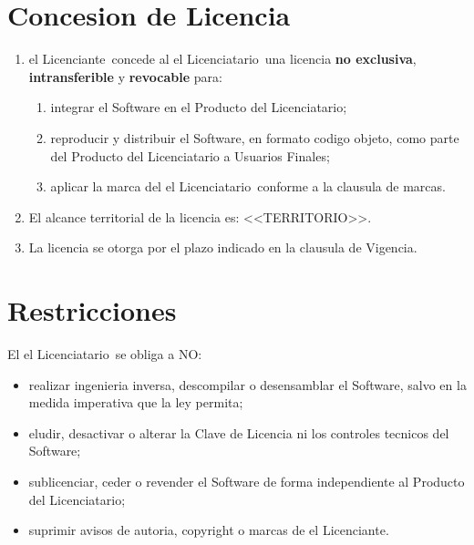 \documentclass[11pt,a4paper]{article}
\newcommand{\LicencianteAbrev}{el Licenciante}
\newcommand{\LicenciatarioAbrev}{el Licenciatario}
\begin{document}
\section{Concesion de Licencia}
\begin{enumerate}
  \item \LicencianteAbrev\ concede al \LicenciatarioAbrev\ una licencia
        \textbf{no exclusiva}, \textbf{intransferible} y \textbf{revocable} para:
        \begin{enumerate}[label=\arabic{enumi}.\arabic*]
          \item integrar el Software en el Producto del Licenciatario;
          \item reproducir y distribuir el Software, en formato codigo objeto, como parte
                del Producto del Licenciatario a Usuarios Finales;
          \item aplicar la marca del \LicenciatarioAbrev\ conforme a la clausula de marcas.
        \end{enumerate}
  \item El alcance territorial de la licencia es: <<TERRITORIO>>.
  \item La licencia se otorga por el plazo indicado en la clausula de Vigencia.
\end{enumerate}

\section{Restricciones}
El \LicenciatarioAbrev\ se obliga a NO:
\begin{itemize}
  \item realizar ingenieria inversa, descompilar o desensamblar el Software, salvo en la
        medida imperativa que la ley permita;
  \item eludir, desactivar o alterar la Clave de Licencia ni los controles tecnicos del Software;
  \item sublicenciar, ceder o revender el Software de forma independiente al Producto del
        Licenciatario;
  \item suprimir avisos de autoria, copyright o marcas de \LicencianteAbrev.
\end{itemize}
\end{document}
